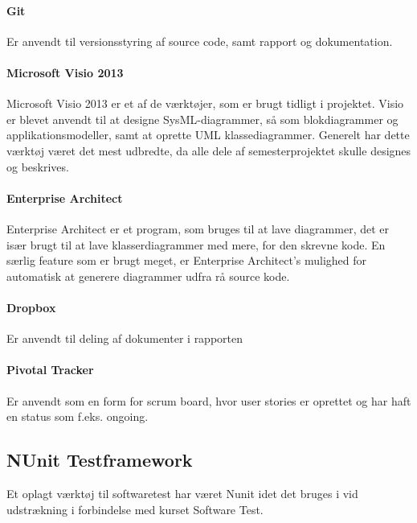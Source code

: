 \paragraph{Git}
Er anvendt til versionsstyring af source code, samt rapport og dokumentation.

\paragraph{Microsoft Visio 2013}
Microsoft Visio 2013 er et af de værktøjer, som er brugt tidligt i projektet. Visio er blevet anvendt til at designe SysML-diagrammer, så som blokdiagrammer og applikationsmodeller, samt at oprette UML klassediagrammer. Generelt har dette værktøj været det mest udbredte, da alle dele af semesterprojektet skulle designes og beskrives.

\paragraph{Enterprise Architect}
Enterprise Architect er et program, som bruges til at lave diagrammer, det er især brugt til at lave klasserdiagrammer med mere, for den skrevne kode. En særlig feature som er brugt meget, er Enterprise Architect's mulighed for automatisk at generere diagrammer udfra rå source kode.

\paragraph{Dropbox}
Er anvendt til deling af dokumenter i rapporten

\paragraph{Pivotal Tracker}
Er anvendt som en form for scrum board, hvor user stories er oprettet og har haft en status som f.eks. ongoing. 

\subsection{NUnit Testframework}
Et oplagt værktøj til softwaretest har været Nunit idet det bruges i vid udstrækning i forbindelse med kurset Software Test.
